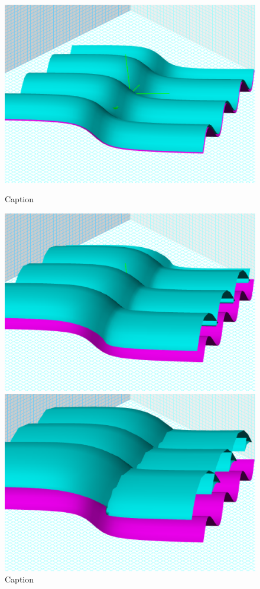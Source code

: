 \begin{figure}[H] 
  \label{surface-2} 
  \begin{minipage}[b]{0.5\linewidth}
    \centering
    \includegraphics[width=.9\linewidth]{surfaces-img/Fig 44.png} 
    \caption{Caption} 
    \label{fig:fig44}
    \vspace{4ex}
  \end{minipage} %
  \begin{minipage}[b]{0.5\linewidth}
    \centering
    \includegraphics[width=.9\linewidth]{surfaces-img/Fig 45.png} 
    \caption{Caption} 
    \label{fig:fig45}
    \vspace{4ex}
  \end{minipage} %
  \begin{minipage}[b]{0.5\linewidth}
    \centering
    \includegraphics[width=.9\linewidth]{surfaces-img/Fig 46.png} 

\end{minipage}
\end{figure}
